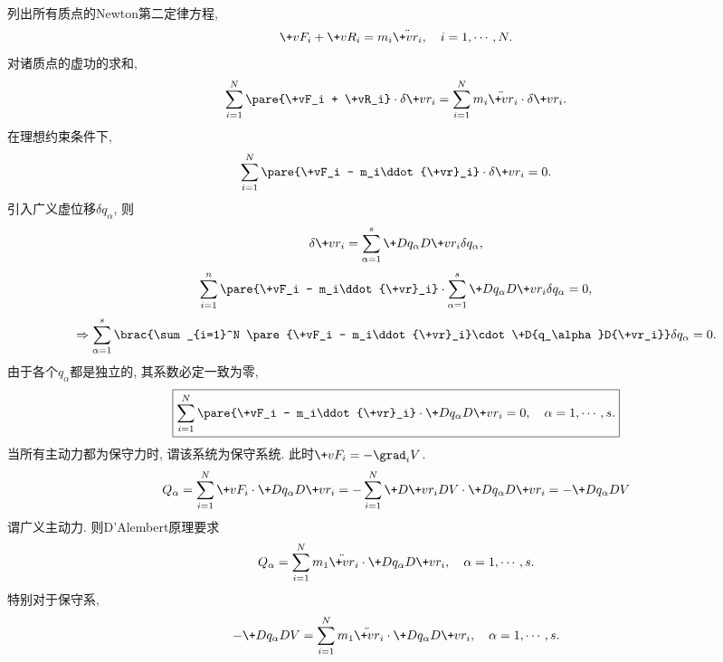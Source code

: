 \documentclass[../LectureNotes.tex]{subfiles}
\begin{document}
列出所有质点的Newton第二定律方程,
\[ \+vF_i + \+vR_i = m_i\ddot{\+vr_i},\quad  i = 1,\cdots, N. \]
对诸质点的虚功的求和,
\[ \sum_{i=1}^N \pare{\+vF_i + \+vR_i}\cdot\delta\+vr_i = \sum_{i=1}^N m_i\ddot{\+vr}_i \cdot\delta\+vr_i. \]
在理想约束条件下,
\[ \sum_{i=1}^N \pare{\+vF_i - m_i\ddot{\+vr}_i}\cdot\delta\+vr_i = 0. \]
引入广义虚位移$\delta q_\alpha$, 则
\[ \delta \+vr_i = \sum_{\alpha=1}^s \+D{q_\alpha}D{\+vr_i}\delta q_\alpha, \]
\[ \sum_{i=1}^n\pare{\+vF_i - m_i\ddot{\+vr}_i}\cdot\sum_{\alpha=1}^s \+D{q_\alpha}D{\+vr_i}\delta q_\alpha = 0, \]
\[ \Rightarrow \sum_{\alpha=1}^s \brac{\sum_{i=1}^N \pare{\+vF_i - m_i\ddot{\+vr}_i}\cdot\+D{q_\alpha}D{\+vr_i}} \delta q_\alpha = 0. \]
由于各个$q_\alpha$都是独立的, 其系数必定一致为零,
\[ \boxed{\sum_{i=1}^N \pare{\+vF_i - m_i\ddot{\+vr}_i}\cdot\+D{q_\alpha}D{\+vr_i} = 0,\quad \alpha = 1,\cdots, s.} \]
当所有主动力都为保守力时, 谓该系统为保守系统. 此时$\+vF_i = -\grad_i V$.
\[ Q_\alpha = \sum_{i=1}^N \+vF_i \cdot \+D{q_\alpha}D{\+vr_i} = -\sum_{i=1}^N \+D{\+vr_i}D{V}\cdot\+D{q_\alpha}D{\+vr_i} = -\+D{q_\alpha}D{V} \]
谓广义主动力. 则D'Alembert原理要求
\[ Q_\alpha = \sum_{i=1}^N m_1\ddot{\+vr}_i\cdot\+D{q_\alpha}D{\+vr_i},\quad \alpha = 1,\cdots,s. \]
特别对于保守系,
\begin{equation}
    \label{eq:保守力的DAlembert原理}
    -\+D{q_\alpha}D{V} = \sum_{i=1}^N m_1\ddot{\+vr}_i\cdot\+D{q_\alpha}D{\+vr_i},\quad \alpha = 1,\cdots,s. 
\end{equation}
\end{document}
